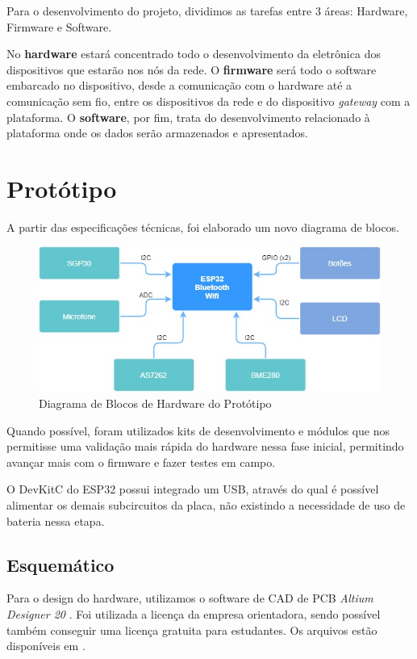 \documentclass[../monografia.tex]{subfiles}
\begin{document}
Para o desenvolvimento do projeto, dividimos as tarefas entre 3 áreas: Hardware, Firmware e Software. 

No \textbf{hardware} estará concentrado todo o desenvolvimento da eletrônica dos dispositivos que estarão nos nós da rede. 
O \textbf{firmware} será todo o software embarcado no dispositivo, desde a comunicação com o hardware até a comunicação sem fio, entre os dispositivos da rede e do dispositivo \textit{gateway} com a plataforma. 
O \textbf{software}, por fim, trata do desenvolvimento relacionado à plataforma onde os dados serão armazenados e apresentados. 

\section{Protótipo}

A partir das especificações técnicas, foi elaborado um novo diagrama de blocos. 

\begin{figure}[h]
    \centering
    \includegraphics[width=12cm]{diagrama_hw_v1}
    \caption{Diagrama de Blocos de Hardware do Protótipo}
    \label{fig:img1}
\end{figure}

Quando possível, foram utilizados kits de desenvolvimento e módulos que nos permitisse uma validação mais rápida do hardware nessa fase inicial, permitindo avançar mais com o firmware e fazer testes em campo. 

O DevKitC do ESP32 possui integrado um USB, através do qual é possível alimentar os demais subcircuitos da placa, não existindo a necessidade de uso de bateria nessa etapa. 

\subsection{Esquemático}

Para o design do hardware, utilizamos o software de CAD de PCB \textit{Altium Designer 20} \cite{altium}. Foi utilizada a licença da empresa orientadora, sendo possível também conseguir uma licença gratuita para estudantes. Os arquivos estão disponíveis em \cite{git_hw}. 
\end{document}
